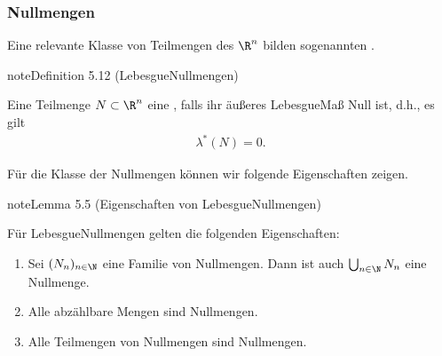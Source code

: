 \documentclass[letterpaper,10pt,english]{jupyterBook}
\begin{document}
\subsubsection{Nullmengen}
\label{\detokenize{masstheorie/masstheorie:nullmengen}}
\sphinxAtStartPar
Eine relevante Klasse von Teilmengen des \(\R^n\) bilden sogenannten .
\label{masstheorie/masstheorie:definition-27}
\begin{sphinxadmonition}{note}{Definition 5.12 (Lebesgue\sphinxhyphen{}Nullmengen)}



\sphinxAtStartPar
Eine Teilmenge \(N \subset \R^n\) eine , falls ihr äußeres Lebesgue\sphinxhyphen{}Maß Null ist, d.h., es gilt
\begin{equation*}
\begin{split}\lambda^*(N) = 0.\end{split}
\end{equation*}\end{sphinxadmonition}

\sphinxAtStartPar
Für die Klasse der Nullmengen können wir folgende Eigenschaften zeigen.
\label{masstheorie/masstheorie:lem:eigenschaftenNullmengen}
\begin{sphinxadmonition}{note}{Lemma 5.5 (Eigenschaften von Lebesgue\sphinxhyphen{}Nullmengen)}



\sphinxAtStartPar
Für Lebesgue\sphinxhyphen{}Nullmengen gelten die folgenden Eigenschaften:
\begin{enumerate}
%
\item {} 
\sphinxAtStartPar
Sei \((N_n)_{n\in\N}\) eine Familie von Nullmengen.
Dann ist auch \(\bigcup_{n\in\N} N_n\) eine Nullmenge.

\item {} 
\sphinxAtStartPar
Alle abzählbare Mengen sind Nullmengen.

\item {} 
\sphinxAtStartPar
Alle Teilmengen von Nullmengen sind Nullmengen.

\end{enumerate}
\end{sphinxadmonition}
\end{document}
